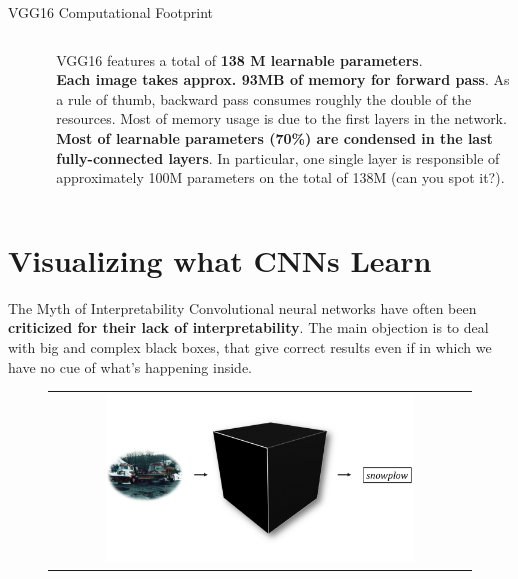 \documentclass[aspectratio=169]{beamer}
\begin{document}
\begin{frame}{VGG16 Computational Footprint}
\begin{columns}
\begin{column}{0.1\textwidth}
\begin{figure}
\begin{tabular}{c}
			\end{tabular}
		\end{figure}
	\end{column}
	\begin{column}{0.9\textwidth}
		VGG16 features a total of \textbf{138 M learnable parameters}.\\
		\vspace{0.5cm}
		\textbf{Each image takes approx. 93MB of memory for forward pass}. As a rule of thumb, backward pass consumes roughly the double of the resources. Most of memory usage is due to the first layers in the network.\\
		\vspace{0.5cm}
		\textbf{Most of learnable parameters (70\%) are condensed in the last fully-connected layers}. In particular, one single layer is responsible of approximately 100M parameters on the total of 138M (can you spot it?). 
	\end{column}
\end{columns}
\end{frame}


\section{Visualizing what CNNs Learn}

\begin{frame}{The Myth of Interpretability}
Convolutional neural networks have often been \textbf{criticized for their lack of interpretability}\cite{lipton2016mythos}. The main objection is to deal with big and complex black boxes, that give correct results even if in which we have no cue of what's happening inside.\\
\vspace{-0.25cm}
\begin{figure}
\begin{tabular}{c}
\includegraphics[width=0.75\textwidth]{img/cnn/black_box.png}
\end{tabular}
\end{figure}
\end{frame}
\end{document}
